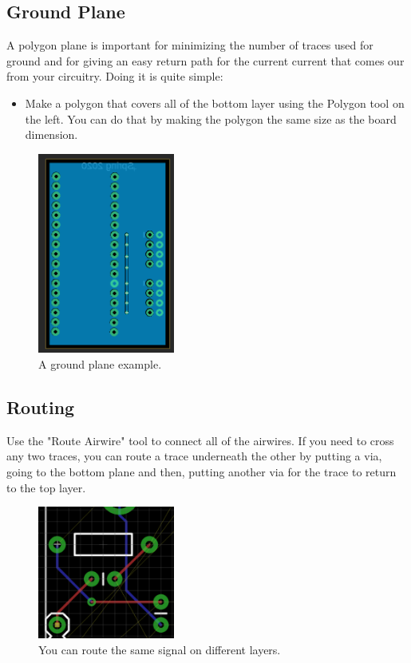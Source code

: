 \documentclass{article}
\begin{document}
\subsection{Ground Plane}
A polygon plane is important for minimizing the number of traces used for ground and for giving an easy return path for the current current that comes our from your circuitry.
Doing it is quite simple:
\begin{itemize}
\item Make a polygon that covers all of the bottom layer using the Polygon tool on the left. You can do that by making the polygon the same size as the board dimension.
\end{itemize}
\begin{figure}[ht]
	\center
	\includegraphics[width=0.4\textwidth, keepaspectratio]{images/groundplane.png}
	\caption{A ground plane example.}
	\label{fig:groundplane}
\end{figure}
\pagebreak
\subsection{Routing}
Use the "Route Airwire" tool to connect all of the airwires. If you need to cross any two traces, you can route a trace underneath the other by putting a via, going to the bottom plane and then, putting another via for the trace to return to the top layer.


\begin{figure}[ht]
	\center
	\includegraphics[width=0.4\textwidth, keepaspectratio]{images/undertrace.png}
	\caption{You can route the same signal on different layers.}
	\label{fig:undertrace}
\end{figure}
\end{document}
